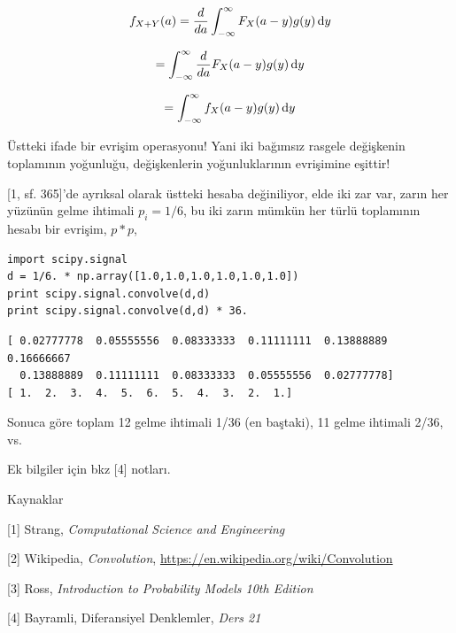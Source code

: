 \documentclass[12pt,fleqn]{article}\usepackage{../../common}
\begin{document}
$$
f_{X+Y}(a) = \frac{d}{da} \int _{-\infty}^{\infty} F_X(a-y) g(y) \,\mathrm{d} y
$$

$$  = \int _{-\infty}^{\infty} \frac{d}{da} F_X(a-y) g(y) \,\mathrm{d} y $$

$$  = \int _{-\infty}^{\infty} f_X(a-y) g(y) \,\mathrm{d} y $$

Üstteki ifade bir evrişim operasyonu! Yani iki bağımsız rasgele değişkenin
toplamının yoğunluğu, değişkenlerin yoğunluklarının evrişimine eşittir!

[1, sf. 365]'de ayrıksal olarak üstteki hesaba değiniliyor, elde iki zar
var, zarın her yüzünün gelme ihtimali $p_i=1/6$, bu iki zarın mümkün her
türlü toplamının hesabı bir evrişim, $p * p$, 

\begin{verbatim}
import scipy.signal
d = 1/6. * np.array([1.0,1.0,1.0,1.0,1.0,1.0])
print scipy.signal.convolve(d,d) 
print scipy.signal.convolve(d,d) * 36.
\end{verbatim}

\begin{verbatim}
[ 0.02777778  0.05555556  0.08333333  0.11111111  0.13888889  0.16666667
  0.13888889  0.11111111  0.08333333  0.05555556  0.02777778]
[ 1.  2.  3.  4.  5.  6.  5.  4.  3.  2.  1.]
\end{verbatim}

Sonuca göre toplam 12 gelme ihtimali 1/36 (en baştaki), 11 gelme ihtimali
2/36, vs.

Ek bilgiler için bkz [4] notları. 

Kaynaklar 

[1] Strang, {\em Computational Science and Engineering}

[2] Wikipedia, {\em Convolution}, \url{https://en.wikipedia.org/wiki/Convolution}

[3] Ross, {\em Introduction to Probability Models 10th Edition}

[4] Bayramli, Diferansiyel Denklemler, {\em Ders 21}
\end{document}
